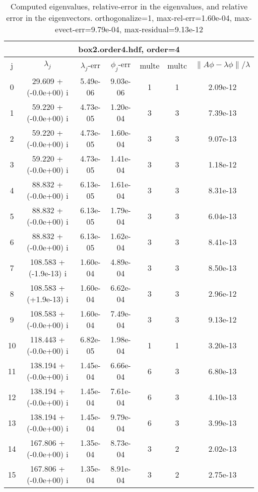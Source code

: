 \begin{table}[H]\tableFont %
\begin{center}
\begin{tabular}{|c|c|c|c|c|c|c|}  \hline
\multicolumn{7}{|c|}{box2.order4.hdf, order=4} \\ \hline
   j    &         $\lambda_j$        & $\lambda_j$-err  & $\phi_j$-err  & multe & multc & $\| A\phi - \lambda\phi\|/\lambda$     \\ \hline
     0  &     29.609 + (-0.0e+00) i  &    5.49e-06      &   9.03e-06    &   1    &  1   &    2.09e-12 \\
     1  &     59.220 + (-0.0e+00) i  &    4.73e-05      &   1.20e-04    &   3    &  3   &    7.39e-13 \\
     2  &     59.220 + (-0.0e+00) i  &    4.73e-05      &   1.60e-04    &   3    &  3   &    9.07e-13 \\
     3  &     59.220 + (-0.0e+00) i  &    4.73e-05      &   1.41e-04    &   3    &  3   &    1.18e-12 \\
     4  &     88.832 + (-0.0e+00) i  &    6.13e-05      &   1.61e-04    &   3    &  3   &    8.31e-13 \\
     5  &     88.832 + (-0.0e+00) i  &    6.13e-05      &   1.79e-04    &   3    &  3   &    6.04e-13 \\
     6  &     88.832 + (-0.0e+00) i  &    6.13e-05      &   1.62e-04    &   3    &  3   &    8.41e-13 \\
     7  &    108.583 + (-1.9e-13) i  &    1.60e-04      &   4.89e-04    &   3    &  3   &    8.50e-13 \\
     8  &    108.583 + (+1.9e-13) i  &    1.60e-04      &   6.62e-04    &   3    &  3   &    2.96e-12 \\
     9  &    108.583 + (-0.0e+00) i  &    1.60e-04      &   7.49e-04    &   3    &  3   &    9.13e-12 \\
    10  &    118.443 + (-0.0e+00) i  &    6.82e-05      &   1.98e-04    &   1    &  1   &    3.20e-13 \\
    11  &    138.194 + (-0.0e+00) i  &    1.45e-04      &   6.66e-04    &   6    &  3   &    6.80e-13 \\
    12  &    138.194 + (-0.0e+00) i  &    1.45e-04      &   7.61e-04    &   6    &  3   &    4.10e-13 \\
    13  &    138.194 + (-0.0e+00) i  &    1.45e-04      &   9.79e-04    &   6    &  3   &    3.99e-13 \\
    14  &    167.806 + (-0.0e+00) i  &    1.35e-04      &   8.73e-04    &   3    &  2   &    2.02e-13 \\
    15  &    167.806 + (-0.0e+00) i  &    1.35e-04      &   8.91e-04    &   3    &  2   &    2.75e-13 \\
\hline
\end{tabular}
\caption{Computed eigenvalues, relative-error in the eigenvalues, and relative error in the eigenvectors. orthogonalize=1, max-rel-err=1.60e-04, max-evect-err=9.79e-04, max-residual=9.13e-12
}\label{table:genEigsbox2.order4.hdf}
\end{center}
\end{table}
